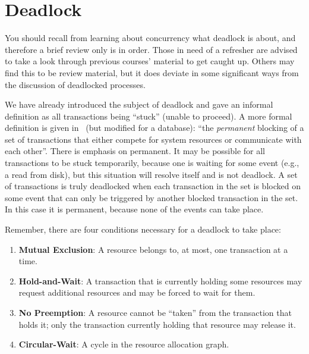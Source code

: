 




\section*{Deadlock}

You should recall from learning about concurrency what deadlock is about, and therefore a brief review only is in order. Those in need of a refresher are advised to take a look through previous courses' material to get caught up. Others may find this to be review material, but it does deviate in some significant ways from the discussion of deadlocked processes.

We have already introduced the subject of deadlock and gave an informal definition as all transactions being ``stuck'' (unable to proceed). A more formal definition is given in~\cite{osi} (but modified for a database): ``the \textit{permanent} blocking of a set of transactions that either compete for system resources or communicate with each other''. There is emphasis on permanent. It may be possible for all transactions to be stuck temporarily, because one is waiting for some event (e.g., a read from disk), but this situation will resolve itself and is not deadlock. A set of transactions is truly deadlocked when each transaction in the set is blocked on some event that can only be triggered by another blocked transaction in the set. In this case it is permanent, because none of the events can take place.

Remember, there are four conditions necessary for a deadlock to take place:

\begin{enumerate}
	\item \textbf{Mutual Exclusion}: A resource belongs to, at most, one transaction at a time.
	\item \textbf{Hold-and-Wait}: A transaction that is currently holding some resources may request additional resources and may be forced to wait for them.
	\item \textbf{No Preemption}: A resource cannot be ``taken'' from the transaction that holds it; only the transaction currently holding that resource may release it.
	\item \textbf{Circular-Wait}: A cycle in the resource allocation graph.
\end{enumerate}

